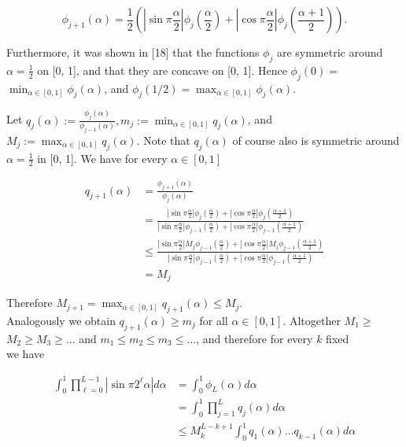 \documentclass[10pt]{article}
\newcommand{\1}{\mathbf{1}}
\begin{document}
$$
\phi_{j+1}(\alpha)=\frac{1}{2}\left(\left|\sin \pi \frac{\alpha}{2}\right| \phi_{j}\left(\frac{\alpha}{2}\right)+\left|\cos \pi \frac{\alpha}{2}\right| \phi_{j}\left(\frac{\alpha+1}{2}\right)\right) .
$$

Furthermore, it was shown in [18] that the functions $\phi_{j}$ are symmetric around $\alpha=\frac{1}{2}$ on [0, 1], and that they are concave on [0, 1]. Hence $\phi_{j}(0)=$ $\min _{\alpha \in[0,1]} \phi_{j}(\alpha)$, and $\phi_{j}(1 / 2)=\max _{\alpha \in[0,1]} \phi_{j}(\alpha)$.

Let $q_{j}(\alpha):=\frac{\phi_{j}(\alpha)}{\phi_{j-1}(\alpha)}, m_{j}:=\min _{\alpha \in[0,1]} q_{j}(\alpha)$, and $M_{j}:=\max _{\alpha \in[0,1]} q_{j}(\alpha)$. Note that $q_{j}(\alpha)$ of course also is symmetric around $\alpha=\frac{1}{2}$ in [0, 1]. We have for every $\alpha \in[0,1]$

$$
\begin{aligned}
q_{j+1}(\alpha) & =\frac{\phi_{j+1}(\alpha)}{\phi_{j}(\alpha)} \\
& =\frac{\left|\sin \pi \frac{\alpha}{2}\right| \phi_{j}\left(\frac{\alpha}{2}\right)+\left|\cos \pi \frac{\alpha}{2}\right| \phi_{j}\left(\frac{\alpha+1}{2}\right)}{\left|\sin \pi \frac{\alpha}{2}\right| \phi_{j-1}\left(\frac{\alpha}{2}\right)+\left|\cos \pi \frac{\alpha}{2}\right| \phi_{j-1}\left(\frac{\alpha+1}{2}\right)} \\
& \leqslant \frac{\left|\sin \pi \frac{\alpha}{2}\right| M_{j} \phi_{j-1}\left(\frac{\alpha}{2}\right)+\left|\cos \pi \frac{\alpha}{2}\right| M_{j} \phi_{j-1}\left(\frac{\alpha+1}{2}\right)}{\left|\sin \pi \frac{\alpha}{2}\right| \phi_{j-1}\left(\frac{\alpha}{2}\right)+\left|\cos \pi \frac{\alpha}{2}\right| \phi_{j-1}\left(\frac{\alpha+1}{2}\right)} \\
& =M_{j}
\end{aligned}
$$

Therefore $M_{j+1}=\max_{\alpha\in[0,1]}q_{j+1}(\alpha) \leqslant M_{j}$.\\
Analogously we obtain $q_{j+1}(\alpha) \geqslant m_{j}$ for all $\alpha \in[0,1]$. Altogether $M_{1} \geqslant$ $M_{2} \geqslant M_{3} \geqslant \ldots$ and $m_{1} \leqslant m_{2} \leqslant m_{3} \leqslant \ldots$, and therefore for every $k$ fixed\\
we have

$$
\begin{aligned}
\int_{0}^{1} \prod_{\ell=0}^{L-1}\left|\sin \pi 2^{\ell} \alpha\right| d \alpha & =\int_{0}^{1} \phi_{L}(\alpha) d \alpha \\
& =\int_{0}^{1} \prod_{j=1}^{L} q_{j}(\alpha) d \alpha \\
& \leqslant M_k^{L-k+1} \int_{0}^{1} q_{1}(\alpha) \ldots q_{k-1}(\alpha) d \alpha
\end{aligned}
$$
\end{document}
